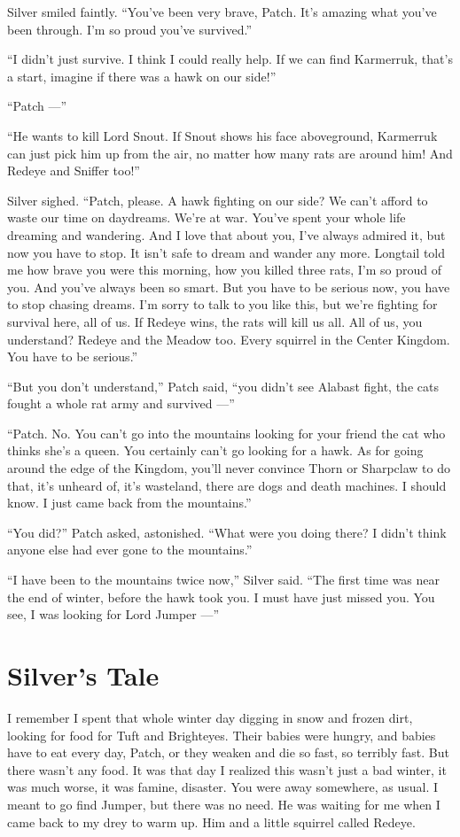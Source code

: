 \documentclass[ebook,oneside,openany,17pt]{memoir}
\newenvironment{tolerant}[1]{%
  \par\tolerance=#1\relax
}{%
  \par
}
\renewcommand{\thechapter}{\Roman{chapter}}
\newcounter{sections}
\newcommand{\sections}[1]{%
  \section*{#1}
  \addtocounter{sections}{1}%
  \pdfbookmark[1]{#1}{section.\thechapter.\thesections}}
\begin{document}
Silver smiled faintly. “You’ve been very brave, Patch. It’s amazing
what you’ve been through. I’m so proud you’ve survived.”

“I didn’t just survive. I think I could really help. If we can find
Karmerruk, that’s a start, imagine if there was a hawk on our side!”

“Patch —”

“He wants to kill Lord Snout. If Snout shows his face aboveground,
Karmerruk can just pick him up from the air, no matter how many rats
are around him! And Redeye and Sniffer too!”

Silver sighed. “Patch, please. A hawk fighting on our side? We can’t
afford to waste our time on daydreams. We’re at war. You’ve spent your
whole life dreaming and wandering. And I love that about you, I’ve
always admired it, but now you have to stop. It isn’t safe to dream
and wander any more. Longtail told me how brave you were this morning,
how you killed three rats, I’m so proud of you. And you’ve always been
so smart. But you have to be serious now, you have to stop chasing
dreams. I’m sorry to talk to you like this, but we’re fighting for
survival here, all of us. If Redeye wins, the rats will kill us
all. All of us, you understand? Redeye and the Meadow too. Every
squirrel in the Center Kingdom. You have to be serious.”

\begin{tolerant}{2000}
“But you don’t understand,” Patch said, “you didn’t see Alabast fight,
the cats fought a whole rat army and survived —”
\end{tolerant}

“Patch. No. You can’t go into the mountains looking for your friend
the cat who thinks she’s a queen. You certainly can’t go looking for a
hawk. As for going around the edge of the Kingdom, you’ll never
convince Thorn or Sharpclaw to do that, it’s unheard of, it’s
wasteland, there are dogs and death machines. I should know. I just
came back from the mountains.”

“You did?” Patch asked, astonished. “What were you doing there? I
didn’t think anyone else had ever gone to the mountains.”

“I have been to the mountains twice now,” Silver said. “The first time
was near the end of winter, before the hawk took you. I must have just
missed you. You see, I was looking for Lord Jumper —”


\sections{Silver’s Tale}

I remember I spent that whole winter day digging in snow and frozen
dirt, looking for food for Tuft and Brighteyes. Their babies were
hungry, and babies have to eat every day, Patch, or they weaken and
die so fast, so terribly fast. But there wasn’t any food. It was that
day I realized this wasn’t just a bad winter, it was much worse, it
was famine, disaster. You were away somewhere, as usual. I meant to go
find Jumper, but there was no need. He was waiting for me when I came
back to my drey to warm up. Him and a little squirrel called Redeye.
\end{document}
